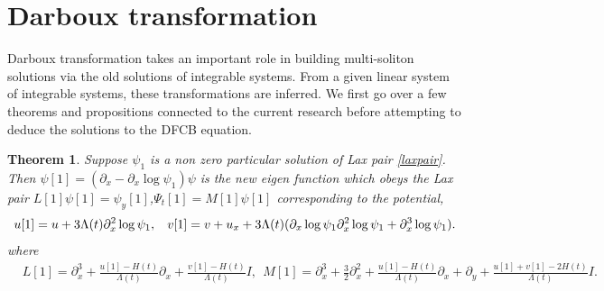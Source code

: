 \documentclass{article}%
\newtheorem{theorem}{Theorem}
\begin{document}
\section{Darboux transformation}
Darboux transformation takes an important role in building multi-soliton solutions via the old solutions of integrable systems. From a given linear system of integrable systems, these transformations are inferred. We first go over a few theorems and propositions connected to the current research before attempting to deduce the solutions to the DFCB equation.
\begin{theorem}
	Suppose $\psi_{1}$ is a non zero particular solution of Lax pair \eqref{laxpair}. Then  $\psi[1]=(\partial_x-\partial_x\log\psi_1)\psi$ is the new eigen function which obeys the Lax pair $L[1]\psi[1]=\psi_y[1] $,\quad $\Psi_t[1]=M[1]\psi[1]$ corresponding to the potential,  
	\begin{equation}
	u[1]=u+3\Lambda(t)\partial^{2}_x\log\psi_1,\hspace{3mm} v[1]=v+u_x+3\Lambda(t)(\partial_x\log\psi_1\partial^{2}_x\log\psi_1+\partial^{3}_x\log\psi_1).\label{Ns}
	\end{equation}
	where 
\begin{equation}
\begin{split}
&L[1]=\partial_x^3+\frac{u[1]-H(t)}{\Lambda(t)}\partial_x+\frac{v[1]-H(t)}{\Lambda(t)}I,~~ M[1]=\partial_x^3+\frac{3}{2}\partial^2_x+\frac{u[1]-H(t)}{\Lambda(t)}\partial_x+\partial_y+\frac{u[1]+v[1]-2H(t)}{\Lambda(t)}I.
\end{split}
\end{equation}	
	
\end{theorem}
\end{document}
